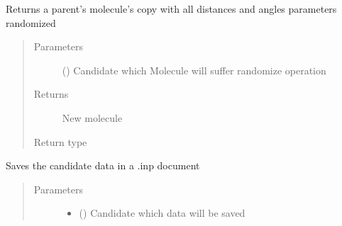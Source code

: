 \documentclass[letterpaper,10pt,english]{sphinxmanual}
\begin{document}
\begin{fulllineitems}
\begin{fulllineitems}
\label{\detokenize{MolOpt:MolOpt.MolOpt.randomize}}
\sphinxAtStartPar
Returns a parent’s molecule’s copy with all distances and angles parameters randomized
\begin{quote}\begin{description}
\item[{Parameters}] \leavevmode
\sphinxAtStartPar
{} ({\hyperref[\detokenize{genetic:genetic.Chromosome}]{}}) \textendash{} Candidate which Molecule will suffer randomize operation

\item[{Returns}] \leavevmode
\sphinxAtStartPar
New molecule

\item[{Return type}] \leavevmode
\sphinxAtStartPar
{\hyperref[\detokenize{molecular:molecular.Molecule}]{}}

\end{description}\end{quote}

\end{fulllineitems}


\begin{fulllineitems}
\label{\detokenize{MolOpt:MolOpt.MolOpt.save}}
\sphinxAtStartPar
Saves the candidate data in a .inp document
\begin{quote}\begin{description}
\item[{Parameters}] \leavevmode\begin{itemize}
\item {} 
\sphinxAtStartPar
{} ({\hyperref[\detokenize{genetic:genetic.Chromosome}]{}}) \textendash{} Candidate which data will be saved


\end{itemize}
\end{description}
\end{quote}
\end{fulllineitems}
\end{fulllineitems}
\end{document}
